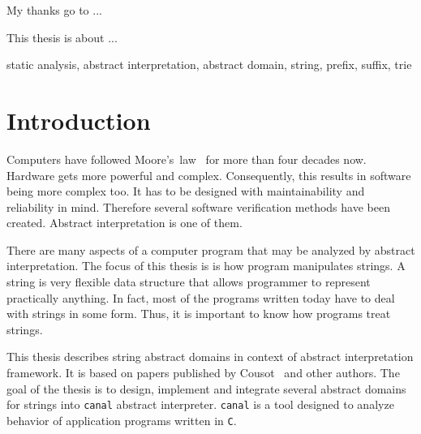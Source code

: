 \documentclass[12pt,final,oneside]{fithesis2}
\newcommand\emptypage{\newpage\null\thispagestyle{empty}\newpage}
\begin{document}
\FrontMatter
\ThesisTitlePage

\emptypage

\begin{ThesisDeclaration}
  \DeclarationText
  \AdvisorName
\end{ThesisDeclaration}

\begin{ThesisThanks}
My thanks go to ...
\end{ThesisThanks}

\begin{ThesisAbstract}
This thesis is about ...
\end{ThesisAbstract}

\begin{ThesisKeyWords}
static analysis, abstract interpretation, abstract domain, string,
prefix, suffix, trie
\end{ThesisKeyWords}

\MainMatter

\tableofcontents


\chapter{Introduction}

Computers have followed Moore's~law~\cite{Moore65-1} for more than
four decades now. Hardware gets more powerful and complex. Consequently,
this results in software being more complex too. It has to be designed
with maintainability and reliability in mind. Therefore several software
verification methods have been created. Abstract interpretation is one
of them.

There are many aspects of a computer program that may be analyzed by
abstract interpretation. The focus of this thesis is
is how program manipulates strings. A string is very flexible data
structure that allows programmer to represent practically anything.
In fact, most of the programs written today have to deal with strings
in some form. Thus, it is important to know how programs treat strings.

This thesis describes string abstract domains in context of abstract
interpretation framework. It is based on papers published
by Cousot~\cite{CousotCousot77-1} and other authors. The goal of the thesis
is to design, implement and integrate several abstract domains for strings
into \texttt{canal} abstract interpreter. \texttt{canal} is a tool designed
to analyze behavior of application programs written in \texttt{C}.
\end{document}
